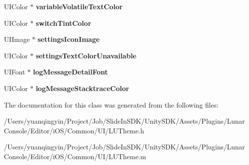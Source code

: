 \begin{DoxyCompactItemize}
\item 
\mbox{\label{interface_l_u_theme_a0f08ddd2c455f9d2351212a9f5a6278d}} 
U\+I\+Color $\ast$ {\bfseries variable\+Volatile\+Text\+Color}
\item 
\mbox{\label{interface_l_u_theme_ab841c448dcf042522067badd2134ccbd}} 
U\+I\+Color $\ast$ {\bfseries switch\+Tint\+Color}
\item 
\mbox{\label{interface_l_u_theme_a9c02b7bf52a8034e8e505b288eb462ad}} 
U\+I\+Image $\ast$ {\bfseries settings\+Icon\+Image}
\item 
\mbox{\label{interface_l_u_theme_a0b580b6feeee1787647f741ffd192886}} 
U\+I\+Color $\ast$ {\bfseries settings\+Text\+Color\+Unavailable}
\item 
\mbox{\label{interface_l_u_theme_ae390610aeabccca4f8c5337d3284b80e}} 
U\+I\+Font $\ast$ {\bfseries log\+Message\+Detail\+Font}
\item 
\mbox{\label{interface_l_u_theme_a61c8c437873b8d88d44691de0049c107}} 
U\+I\+Color $\ast$ {\bfseries log\+Message\+Stacktrace\+Color}
\end{DoxyCompactItemize}


The documentation for this class was generated from the following files\+:\begin{DoxyCompactItemize}
\item 
/\+Users/yuanqingyin/\+Project/\+Job/\+Slide\+In\+S\+D\+K/\+Unity\+S\+D\+K/\+Assets/\+Plugins/\+Lunar\+Console/\+Editor/i\+O\+S/\+Common/\+U\+I/L\+U\+Theme.\+h\item 
/\+Users/yuanqingyin/\+Project/\+Job/\+Slide\+In\+S\+D\+K/\+Unity\+S\+D\+K/\+Assets/\+Plugins/\+Lunar\+Console/\+Editor/i\+O\+S/\+Common/\+U\+I/L\+U\+Theme.\+m\end{DoxyCompactItemize}
